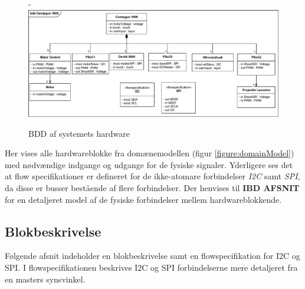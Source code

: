\begin{figure}[H]
	\begin{adjustwidth}{-3cm}{-\rightmargin}
	\centering
	\includegraphics[width=0.9\paperwidth]{SystemArkitektur/images/bddDiagram}
	\caption{BDD af systemets hardware}
	\label{figure:bddDiagram}
	\end{adjustwidth}
\end{figure}

Her vises alle hardwareblokke fra domænemodellen (figur \ref{figure:domainModel}) med nødvændige indgange og udgange for de fysiske signaler. Yderligere ses det at flow specifikationer er defineret for de ikke-atomare forbindelser \textit{I2C} samt \textit{SPI}, da disse er busser bestående af flere forbindelser. Der henvises til \textbf{IBD AFSNIT} for en detaljeret model af de fysiske forbindelser mellem hardwareblokkende.

\subsection{Blokbeskrivelse}
Følgende afsnit indeholder en blokbeskrivelse samt en flowspecifikation for I2C og SPI. I flowspecifikationen beskrives I2C og SPI forbindelserne mere detaljeret fra en masters synsvinkel. \newline

